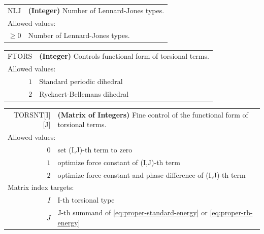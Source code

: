 \documentclass[10pt,a4paper,openany]{memoir}
\numberwithin{equation}{section}
\begin{document}
{
\begin{tabular}{r@{ : }l}
\label{descr:nlj}
       NLJ&\textbf{(Integer)} Number of Lennard-Jones types.                                                   \\ 
\multicolumn{2}{l}{Allowed values:} \\ 
     \( \geq 0\)&  Number of Lennard-Jones types.                                                         \\ 
\end{tabular}
\vspace{1ex}
}


{
\begin{tabular}{r@{ : }l}
\label{descr:ftors}
     FTORS&\textbf{(Integer)} Controls functional form of torsional terms.                                                         \\ 
\multicolumn{2}{l}{Allowed values:} \\ 
     \(1\)&Standard periodic dihedral                                                                           \\ 
     \(2\)&Ryckaert-Bellemans dihedral                                                                          \\ 
\end{tabular}
\vspace{1ex}
}

{
\begin{tabular}{r@{ : }l}
\label{descr:torsnt}
    TORSNT[I][J]&\textbf{(Matrix of Integers)} Fine control of the functional form of torsional terms.                                               \\ 
\multicolumn{2}{l}{Allowed values:} \\ 
     \(0\)&set (I,J)-th term to zero                                                                                \\ 
  \(1\)&optimize force constant of (I,J)-th term                                                                                   \\
  \(2\)&optimize force constant and phase difference of (I,J)-th term                                                                                   \\ 
\multicolumn{2}{l}{Matrix index targets:} \\ 
     \(I\)&I-th torsional type                                                                    \\ 
     \(J\)&J-th summand of \autoref{eq:proper-standard-energy} or \autoref{eq:proper-rb-energy}                                                                                          \\ 
\end{tabular}
\vspace{1ex}
}
\end{document}
